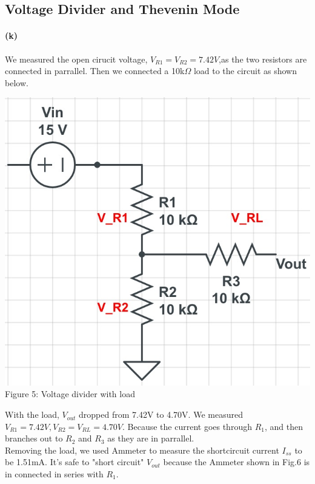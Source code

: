 \documentclass[]{article}
\begin{document}
\subsection*{Voltage Divider and Thevenin Mode}	
	\paragraph{ (k)}
	We measured the open cirucit voltage, $V_{R1} =V_{R2} =7.42V$,as the two resistors are connected in parrallel. Then we connected a 10k$\Omega$ load to the circuit as shown below. 
		\begin{center} 
			\includegraphics[scale=0.2]{lab1_k2}\\
			Figure 5: Voltage divider with load		
		\end{center}
	With the load, $V_{out}$ dropped from 7.42V to 4.70V. We measured $V_{R1}=7.42V, V_{R2}=V_{RL}=4.70V$. Because the current goes through $R_{1}$, and then branches out to $R_{2}$ and $R_{3}$ as they are in parrallel. \\
	Removing the load, we used Ammeter to measure the shortcircuit current $I_{ss}$ to be 1.51mA. It's safe to "short circuit" $V_{out}$ because the Ammeter shown in Fig.6 is in connected in series with $R_{1}$.
\end{document}
